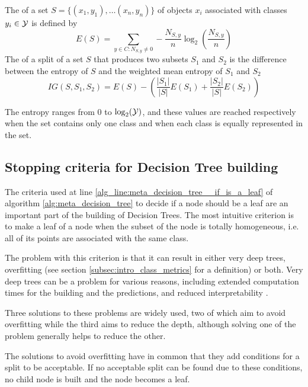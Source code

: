 \begin{definition}
    The  of a set $S = \{(x_1, y_1),\allowbreak\dots (x_n, y_n)\}$ of objects $x_i$ associated with classes $y_i \in \mathcal{Y}$ is defined by
    \begin{equation}
        E(S) = \sum_{y \in C : N_{S, y} \neq 0} -\frac{N_{S, y}}{n} \log_2 \left( \frac{N_{S, y}}{n} \right)
    \end{equation}
    The  of a split of a set $S$ that produces two subsets $S_1$ and $S_2$ is the difference between the entropy of $S$ and the weighted mean entropy of $S_1$ and $S_2$
    \begin{equation}
        IG(S, S_1, S_2) = E(S) - \left(\frac{|S_1|}{|S|} E(S_1) + \frac{|S_2|}{|S|} E(S_2)\right)
    \end{equation}
\end{definition}
The entropy ranges from 0 to $\log_2(\mathcal{Y})$, and these values are reached respectively when the set contains only one class and when each class is equally represented in the set.

\subsection{Stopping criteria for Decision Tree building}
The criteria used at line \ref{alg_line:meta_decision_tree__if_is_a_leaf} of algorithm \ref{alg:meta_decision_tree} to decide if a node should be a leaf are an important part of the building of Decision Trees. The most intuitive criterion is to make a leaf of a node when the subset of the node is totally homogeneous, i.e. all of its points are associated with the same class.

The problem with this criterion is that it can result in either very deep trees, overfitting (see section \ref{subsec:intro_class_metrics} for a definition) or both. Very deep trees can be a problem for various reasons, including extended computation times for the building and the predictions, and reduced interpretability . 

Three solutions to these problems are widely used, two of which aim to avoid overfitting while the third aims to reduce the depth, although solving one of the problem generally helps to reduce the other.

The solutions to avoid overfitting have in common that they add conditions for a split to be acceptable. If no acceptable split can be found due to these conditions, no child node is built and the node becomes a leaf.


